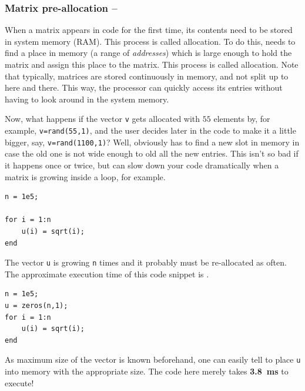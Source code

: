 \subsubsection{Matrix pre-allocation -- \fastsymbol\fastsymbol\fastsymbol\fastsymbol\fastsymbol}

When a matrix appears in \matlab{} code for the first time, its contents need to be stored in system memory (RAM). This process is called allocation. To do this, \matlab{} needs to find a place in memory (a range of \emph{addresses}) which is large enough to hold the matrix and assign this place to the matrix. This process is called allocation. Note that typically, matrices are stored continuously in memory, and not split up to here and there. This way, the processor can quickly access its entries without having to look around in the system memory.


Now, what happens if the vector \lstinline!v! gets allocated with $55$ elements by, for example, \lstinline!v=rand(55,1)!, and the user decides later in the code to make it a little bigger, say, \lstinline!v=rand(1100,1)!? Well, obviously \matlab{} has to find a new slot in memory in case the old one is not wide enough to old all the new entries. This isn't so bad if it happens once or twice, but can slow down your code dramatically when a matrix is growing inside a loop, for example.


\hfill
\begin{minipage}[t]{.45\textwidth}
\begin{lstlisting}[framerule=2pt,rulecolor=\color{badred}]
n = 1e5;

for i = 1:n
    u(i) = sqrt(i);
end
\end{lstlisting}
The vector \lstinline!u! is growing \lstinline!n! times and it probably must be re-allocated as often. The approximate execution time of this code snippet is .
\end{minipage}
\hfill
\begin{minipage}[t]{.45\textwidth}
\begin{lstlisting}[framerule=2pt,rulecolor=\color{goodgreen}]
n = 1e5;
u = zeros(n,1);
for i = 1:n
    u(i) = sqrt(i);
end
\end{lstlisting}
As maximum size of the vector is known beforehand, one can easily tell \matlab{} to place \lstinline!u! into memory with the appropriate size. The code here merely takes \textbf{\SI{3.8}{\milli\second}} to execute!
\end{minipage}
\hfill

